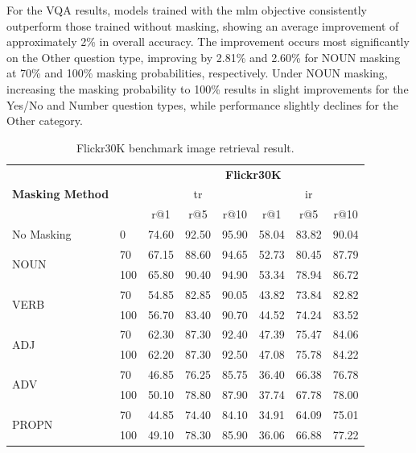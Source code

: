 For the VQA results, models trained with the \acrshort{mlm} objective consistently outperform those trained without masking, showing an average improvement of approximately 2\% in overall accuracy.
The improvement occurs most significantly on the Other question type, improving by 2.81\% and 2.60\% for NOUN masking at 70\% and 100\% masking probabilities, respectively.
Under NOUN masking, increasing the masking probability to 100\% results in slight improvements for the Yes/No and Number question types, while performance slightly declines for the Other category.

\begin{table}[h]
    \centering
    \caption{Flickr30K benchmark image retrieval result.}
    \label{tab:flickr30k-prob}
    \begin{adjustbox}{width=0.8\textwidth}
        \begin{tabular}{ll|l|ccc|ccc}
            \hline
            \multicolumn{2}{c|}{\multirow{3}{*}{\textbf{Masking Method}}} & {\multirow{3}{*}{\textbf{Masking probability}}} & \multicolumn{6}{c}{\textbf{Flickr30K}} \\
            & & & \multicolumn{3}{c|}{\acrshort{tr}} & \multicolumn{3}{c}{\acrshort{ir}} \\
            & & & r@1 & r@5 & r@10 & r@1 & r@5 & r@10 \\
            \hline
            \multicolumn{2}{l|}{No Masking} & 0 & 74.60 & 92.50 & 95.90 & 58.04 & 83.82 & 90.04 \\
            \hline
            \multicolumn{2}{l|}{\multirow{2}{*}{NOUN}} & 70 & 67.15 & 88.60 & 94.65 & 52.73 & 80.45 & 87.79 \\
            & & 100 & 65.80 & 90.40 & 94.90 & 53.34 & 78.94 & 86.72 \\
            \hline
            \multicolumn{2}{l|}{\multirow{2}{*}{VERB}} & 70 & 54.85 & 82.85 & 90.05 & 43.82 & 73.84 & 82.82 \\
            & & 100 & 56.70 & 83.40 & 90.70 & 44.52 & 74.24 & 83.52 \\
            \hline
            \multicolumn{2}{l|}{\multirow{2}{*}{ADJ}} & 70 & 62.30 & 87.30 & 92.40 & 47.39 & 75.47 & 84.06 \\
            & & 100 & 62.20 & 87.30 & 92.50 & 47.08 & 75.78 & 84.22 \\
            \hline
            \multicolumn{2}{l|}{\multirow{2}{*}{ADV}} & 70 & 46.85 & 76.25 & 85.75 & 36.40 & 66.38 & 76.78 \\
            & & 100 & 50.10 & 78.80 & 87.90 & 37.74 & 67.78 & 78.00 \\
            \hline
            \multicolumn{2}{l|}{\multirow{2}{*}{PROPN}} & 70 & 44.85 & 74.40 & 84.10 & 34.91 & 64.09 & 75.01 \\
            & & 100 & 49.10 & 78.30 & 85.90 & 36.06 & 66.88 & 77.22 \\
            \hline
        \end{tabular}
    \end{adjustbox}
\end{table}

